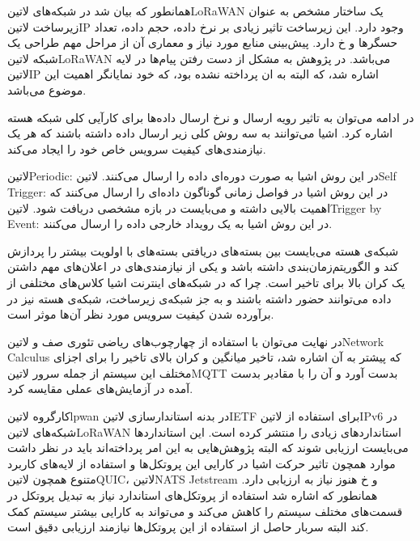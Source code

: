 
همانطور که بیان شد در شبکه‌های ‌لاتین{LoRaWAN} یک ساختار مشخص به عنوان زیرساخت ‌لاتین{IP} وجود دارد.
این زیرساخت تاثیر زیادی بر نرخ داده، حجم داده، تعداد حسگرها و ‌خ دارد. پیش‌بینی منابع مورد نیاز و معماری آن از مراحل مهم طراحی یک شبکه ‌لاتین{LoRaWAN} می‌باشد.
در پژوهش  به مشکل از دست رفتن پیام‌ها در لایه ‌لاتین{IP} اشاره شد، که البته به ان پرداخته نشده بود، که خود نمایانگر اهمیت این موضوع می‌باشد.

در ادامه می‌توان به تاثیر رویه ارسال و نرخ ارسال داده‌ها برای کارآیی کلی شبکه هسته اشاره کرد.
اشیا می‌توانند به سه روش کلی زیر ارسال داده داشته باشند که هر یک نیازمندی‌های کیفیت سرویس خاص خود را ایجاد می‌کند.

 ‌لاتین{Periodic}: در این روش اشیا به صورت دوره‌ای داده را ارسال می‌کنند.
 ‌لاتین{Self Trigger}: در این روش اشیا در فواصل زمانی گوناگون داده‌ای را ارسال می‌کنند که اهمیت بالایی داشته و می‌بایست در بازه مشخصی دریافت شود.
 ‌لاتین{Trigger by Event}: در این روش اشیا به یک رویداد خارجی داده را ارسال می‌کنند.

شبکه‌ی هسته می‌بایست بین بسته‌های دریافتی بسته‌های با اولویت بیشتر را پردازش کند و الگوریتم‌زمان‌بندی داشته باشد و یکی از نیازمندی‌های در اعلان‌های مهم داشتن یک کران بالا برای تاخیر است.
چرا که در شبکه‌های اینترنت اشیا کلاس‌های مختلفی از داده می‌توانند حضور داشته باشند و به جز شبکه‌ی زیرساخت، شبکه‌ی هسته نیز در برآورده شدن کیفیت سرویس مورد نظر آن‌ها موثر است.

در نهایت می‌توان با استفاده از چهارچوب‌های ریاضی تئوری صف و ‌لاتین{Network Calculus} که پیشتر به آن اشاره شد،
تاخیر میانگین و کران بالای تاخیر را برای اجزای مختلف این سیستم از جمله
سرور ‌لاتین{MQTT} بدست آورد و آن را با مقادیر بدست آمده در آزمایش‌های عملی
مقایسه کرد.


کارگروه ‌لاتین{lpwan} در بدنه استاندارسازی ‌لاتین{IETF} برای استفاده از ‌لاتین{IPv6} در شبکه‌های ‌لاتین{LoRaWAN} استانداردهای زیادی را منتشر کرده است.
این استانداردها می‌بایست ارزیابی شوند که البته پژوهش‌هایی به این امر پرداخته‌اند باید در نظر داشت موارد همچون تاثیر حرکت اشیا در کارایی این پروتکل‌ها و استفاده از لایه‌های کاربرد متنوع همچون ‌لاتین{QUIC}، ‌لاتین{NATS Jetstream} و ‌خ هنوز نیاز به ارزیابی دارد.
همانطور که اشاره شد استفاده از پروتکل‌های استاندارد نیاز به تبدیل پروتکل در قسمت‌های مختلف سیستم را کاهش می‌کند و می‌تواند به کارایی بیشتر سیستم کمک کند البته سربار حاصل از استفاده از این پروتکل‌ها نیازمند ارزیابی دقیق است.

